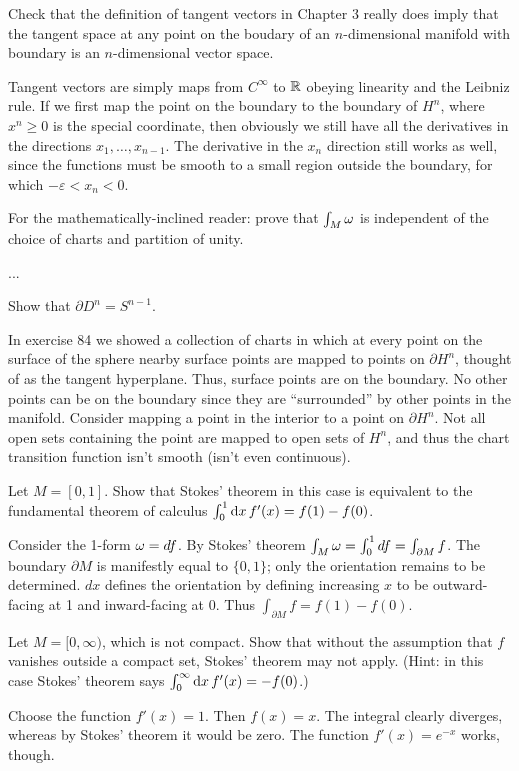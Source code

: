 \begin{p}%
{Check that the definition of tangent vectors in Chapter 3 really does imply that the tangent space at any point on the boudary of an $n$-dimensional manifold with boundary is an $n$-dimensional vector space.}
\end{p}
{Tangent vectors are simply maps from $C^\infty$ to $\mathbb{R}$ obeying linearity and the Leibniz rule. If we first map the point on the boundary to the boundary of $H^n$, where $x^n\geq 0$ is the special coordinate, 
then obviously 
we still have all the derivatives in the directions $x_1,\dots,x_{n{-}1}$. The derivative in the $x_n$ direction still works as well, since the functions must be smooth to a small region outside the boundary, for which $-\varepsilon<x_n<0$. }

\begin{p}%
{For the mathematically-inclined reader: prove that $\int_M\omega$ is independent of the 
choice of charts and partition of unity.}
\end{p}
...

\begin{p}%
{Show that $\partial D^n=S^{n{-}1}$.}
\end{p}
{In exercise 84 we showed a collection of charts in which
at every point on the surface of the sphere nearby surface points are mapped to points on $\partial H^n$, thought of as the tangent hyperplane. Thus, surface points are on the boundary. No other points can be on the boundary since they are ``surrounded'' by other points in the manifold. Consider mapping a point in the interior to a point on $\partial H^n$. Not all open sets containing the point are mapped to open sets of $H^n$, and thus the chart transition function isn't smooth (isn't even continuous).}

\begin{p}%
{Let $M=[0,1]$. Show that Stokes' theorem in this case is equivalent to the fundamental theorem
of calculus $\int_0^1 {\rm d}x\, f'(x)=f(1)-f(0)$.}
\end{p}
{Consider the 1-form $\omega=df$. By Stokes' theorem $\int_M \omega=\int_0^1 df=\int_{\partial M}f$. The boundary $\partial M$ is manifestly equal to $\{0,1\}$; only the orientation remains to be determined.  $dx$ defines the orientation by defining increasing $x$ to be outward-facing at 1 and inward-facing at 0. Thus $\int_{\partial M}f=f(1)-f(0)$.}

\begin{p}%
{Let $M=[0,\infty)$, which is not compact. Show that without the assumption that $f$ vanishes outside a compact set, Stokes' theorem may not apply. (Hint: in this case Stokes' theorem says $\int_0^\infty {\rm d}x\, f'(x)=-f(0)$.)}
\end{p}
{Choose the function $f'(x)=1$. Then $f(x)=x$. The integral clearly diverges, whereas 
by Stokes' theorem it would be zero. The function $f'(x)=e^{-x}$ works, though.}


